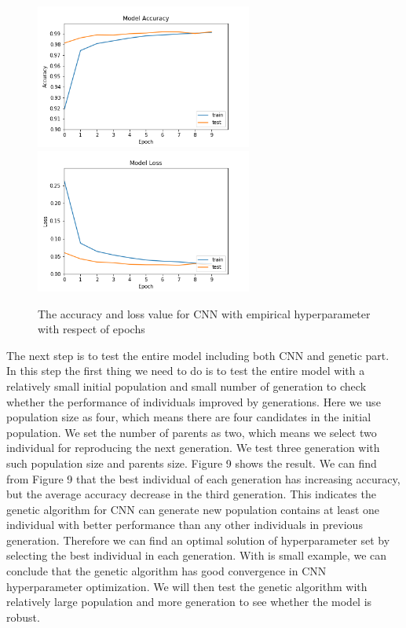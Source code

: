 \documentclass[12pt]{article}
\begin{document}
\begin{figure}
\begin{center}
\includegraphics[width =2.8in]{accuracy.png}
\includegraphics[width =2.8in]{loss.png}
\caption{The accuracy and loss value for CNN with empirical hyperparameter with respect of epochs}
\end{center}
\label{fig:pic8}
\end{figure}
The next step is to test the entire model including both CNN and genetic part. In this step the first thing we need to do is to test the entire model with a relatively small initial population and small number of generation to check whether the performance of individuals improved by generations. Here we use population size as four, which means there are four candidates in the initial population. We set the number of parents as two, which means we select two individual for reproducing the next generation. We test three generation with such population size and parents size. Figure 9 shows the result. We can find from Figure 9 that the best individual of each generation has increasing accuracy, but the average accuracy decrease in the third generation. This indicates the genetic algorithm for CNN can generate new population contains at least one individual with better performance than any other individuals in previous generation. Therefore we can find an optimal solution of hyperparameter set by selecting the best individual in each generation. With is small example, we can conclude that the genetic algorithm has good convergence in CNN hyperparameter optimization. We will then test the genetic algorithm with relatively large population and more generation to see whether the model is robust.
\end{document}
